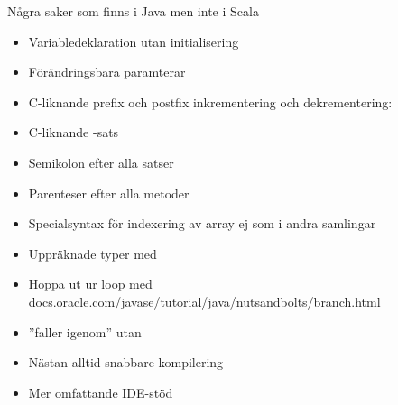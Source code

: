 \begin{Slide}{Några saker som finns i Java men inte i Scala}\SlideFontSmall
\vspace{-0.7em}\begin{multicols}{2}
\begin{itemize}
\item Variabledeklaration utan initialisering

\item Förändringsbara paramterar

\item C-liknande prefix och postfix inkrementering och dekrementering: 

\item C-liknande -sats

\item Semikolon efter alla satser

\item Parenteser efter alla metoder

\item Specialsyntax för indexering av array \code{[]} ej som i andra samlingar

\item Uppräknade typer med {\texttt{\bfseries{\color{eclipsepurple}{enum}}}}

\item Hoppa ut ur loop med  \\ \href{https://docs.oracle.com/javase/tutorial/java/nutsandbolts/branch.html}{docs.oracle.com/javase/tutorial/java/nutsandbolts/branch.html}

\item {} ''faller igenom'' utan 

\item Nästan alltid snabbare kompilering

\item Mer omfattande IDE-stöd
\end{itemize}

\end{multicols}
\end{Slide}



